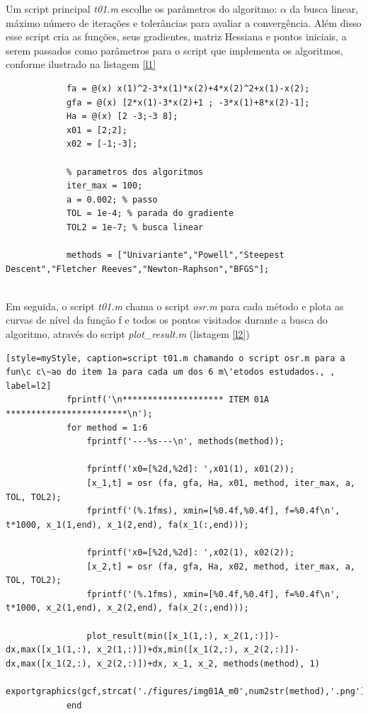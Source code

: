 \documentclass[10pt, a4paper]{article}
\begin{document}
Um script principal \textit{t01.m} escolhe os par\^ametros do algoritmo: $\alpha$ da busca linear, m\'aximo n\'umero de itera\c c\~oes e toler\^ancias para avaliar a converg\^encia. Al\'em disso esse script cria as fun\c c\~oes, seus gradientes, matriz Hessiana e pontos iniciais, a serem passados como par\^ametros para o script que implementa os algoritmos, conforme ilustrado na listagem \ref{l1}

\begin{minipage}{\linewidth}
      \begin{lstlisting}[style=myStyle, caption=script t01.m setando par\^ametros e criando as fun\c c\~oes, label=l1]
            % dados do item 01a, f, grad f, hess f e x0
            fa = @(x) x(1)^2-3*x(1)*x(2)+4*x(2)^2+x(1)-x(2);
            gfa = @(x) [2*x(1)-3*x(2)+1 ; -3*x(1)+8*x(2)-1];
            Ha = @(x) [2 -3;-3 8];
            x01 = [2;2];
            x02 = [-1;-3];

            % parametros dos algoritmos
            iter_max = 100;
            a = 0.002; % passo
            TOL = 1e-4; % parada do gradiente
            TOL2 = 1e-7; % busca linear

            methods = ["Univariante","Powell","Steepest Descent","Fletcher Reeves","Newton-Raphson","BFGS"];
      \end{lstlisting}
\end{minipage} \\

Em seguida, o script \textit{t01.m} chama o script \textit{osr.m} para cada m\'etodo e plota as curvas de n\'ivel da fun\c c\~ao f e todos os pontos visitados durante a busca do algoritmo, atrav\'es do script \textit{plot\_result.m} (listagem \ref{l2})

\begin{minipage}{\linewidth}
      \begin{lstlisting}[style=myStyle, caption=script t01.m chamando o script osr.m para a fun\c c\~ao do item 1a para cada um dos 6 m\'etodos estudados., , label=l2]
            fprintf('\n******************** ITEM 01A ************************\n');
            for method = 1:6
                fprintf('---%s---\n', methods(method));

                fprintf('x0=[%2d,%2d]: ',x01(1), x01(2));
                [x_1,t] = osr (fa, gfa, Ha, x01, method, iter_max, a, TOL, TOL2);
                fprintf('(%.1fms), xmin=[%0.4f,%0.4f], f=%0.4f\n', t*1000, x_1(1,end), x_1(2,end), fa(x_1(:,end)));

                fprintf('x0=[%2d,%2d]: ',x02(1), x02(2));
                [x_2,t] = osr (fa, gfa, Ha, x02, method, iter_max, a, TOL, TOL2);
                fprintf('(%.1fms), xmin=[%0.4f,%0.4f], f=%0.4f\n', t*1000, x_2(1,end), x_2(2,end), fa(x_2(:,end)));

                plot_result(min([x_1(1,:), x_2(1,:)])-dx,max([x_1(1,:), x_2(1,:)])+dx,min([x_1(2,:), x_2(2,:)])-dx,max([x_1(2,:), x_2(2,:)])+dx, x_1, x_2, methods(method), 1)
                exportgraphics(gcf,strcat('./figures/img01A_m0',num2str(method),'.png'),'Resolution',500)
            end
      \end{lstlisting}
\end{minipage} \\
\end{document}
